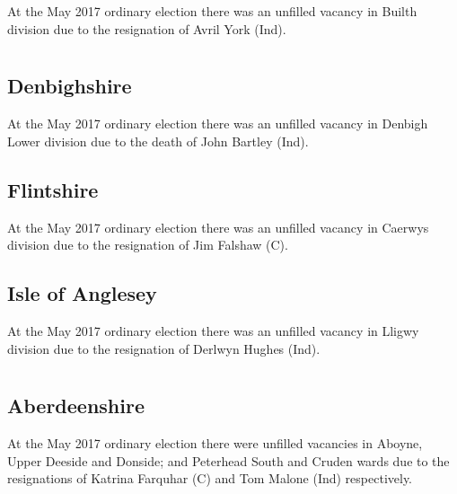 \documentclass[a4paper,openany]{book}
\begin{document}
\begin{resultsiii}
At the May 2017 ordinary election there was an unfilled vacancy in Builth division due to the resignation of Avril York (Ind).

\section[North Wales]{}

\subsection*{Denbighshire}

At the May 2017 ordinary election there was an unfilled vacancy in Denbigh Lower division due to the death of John Bartley (Ind).

\subsection*{Flintshire}

At the May 2017 ordinary election there was an unfilled vacancy in Caerwys division due to the resignation of Jim Falshaw (C).

\subsection*{Isle of Anglesey}

At the May 2017 ordinary election there was an unfilled vacancy in Lligwy division due to the resignation of Derlwyn Hughes (Ind).

\section[Aberdeen City and Shire]{}

\subsection*{Aberdeenshire}

At the May 2017 ordinary election there were unfilled vacancies in Aboyne, Upper Deeside and Donside; and Peterhead South and Cruden wards due to the resignations of Katrina Farquhar (C) and Tom Malone (Ind) respectively.


\end{resultsiii}
\end{document}
